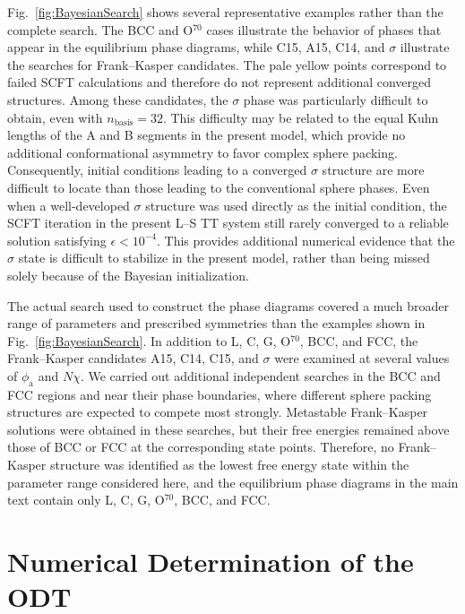 \documentclass[journal=mamobx,manuscript=article]{achemso}
\begin{document}
	Fig.~\ref{fig:BayesianSearch} shows several representative examples rather than the complete search.
	The BCC and O$^{70}$ cases illustrate the behavior of phases that appear in the equilibrium phase diagrams, while C15, A15, C14, and $\sigma$ illustrate the searches for Frank--Kasper candidates.
	The pale yellow points correspond to failed SCFT calculations and therefore do not represent additional converged structures.
	Among these candidates, the $\sigma$ phase was particularly difficult to obtain, even with $n_{\mathrm{basis}}=32$.
	This difficulty may be related to the equal Kuhn lengths of the A and B segments in the present model, which provide no additional conformational asymmetry to favor complex sphere packing.
	Consequently, initial conditions leading to a converged $\sigma$ structure are more difficult to locate than those leading to the conventional sphere phases.
	Even when a well-developed $\sigma$ structure was used directly as the initial condition, the SCFT iteration in the present L--S TT system still rarely converged to a reliable solution satisfying $\epsilon<10^{-4}$.
	This provides additional numerical evidence that the $\sigma$ state is difficult to stabilize in the present model, rather than being missed solely because of the Bayesian initialization.
	

	The actual search used to construct the phase diagrams covered a much broader range of parameters and prescribed symmetries than the examples shown in Fig.~\ref{fig:BayesianSearch}.
	In addition to L, C, G, O$^{70}$, BCC, and FCC, the Frank--Kasper candidates A15, C14, C15, and $\sigma$ were examined at several values of $\phi_{\mathrm a}$ and $N\chi$.
	We carried out additional independent searches in the BCC and FCC regions and near their phase boundaries, where different sphere packing structures are expected to compete most strongly.
	Metastable Frank--Kasper solutions were obtained in these searches, but their free energies remained above those of BCC or FCC at the corresponding state points.
	Therefore, no Frank--Kasper structure was identified as the lowest free energy state within the parameter range considered here, and the equilibrium phase diagrams in the main text contain only L, C, G, O$^{70}$, BCC, and FCC.


\section{Numerical Determination of the ODT}\label{sec:ODT}
\end{document}
